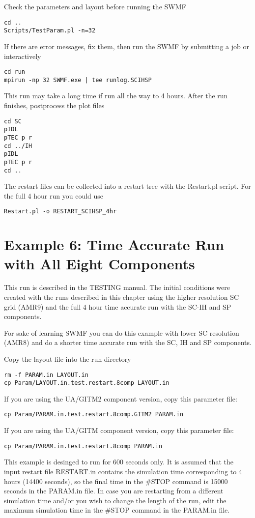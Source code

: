 Check the parameters and layout before running the SWMF
\begin{verbatim}
cd ..
Scripts/TestParam.pl -n=32
\end{verbatim}
If there are error messages, fix them, then run the SWMF by submitting a job
or interactively
\begin{verbatim}
cd run
mpirun -np 32 SWMF.exe | tee runlog.SCIHSP
\end{verbatim}
This run may take a long time if run all the way to 4 hours.
After the run finishes, postprocess the plot files
\begin{verbatim}
cd SC
pIDL
pTEC p r
cd ../IH
pIDL
pTEC p r
cd ..
\end{verbatim}
The restart files can be collected into a restart tree 
with the Restart.pl script. For the full 4 hour run you could use
\begin{verbatim}
Restart.pl -o RESTART_SCIHSP_4hr
\end{verbatim}

\section{Example 6: Time Accurate Run with All Eight Components}

This run is described in the TESTING manual. 
The initial conditions were created with the runs described in
this chapter using the higher resolution SC grid (AMR9) and the full 4 hour
time accurate run with the SC-IH and SP components.

For sake of learning SWMF you can do this example with lower SC resolution
(AMR8) and do a shorter time accurate run with the SC, IH and SP components.

Copy the layout file into the run directory
\begin{verbatim}
rm -f PARAM.in LAYOUT.in
cp Param/LAYOUT.in.test.restart.8comp LAYOUT.in
\end{verbatim}
If you are using the UA/GITM2 component version, copy this parameter file:
\begin{verbatim}
cp Param/PARAM.in.test.restart.8comp.GITM2 PARAM.in
\end{verbatim}
If you are using the UA/GITM component version, copy this parameter file:
\begin{verbatim}
cp Param/PARAM.in.test.restart.8comp PARAM.in
\end{verbatim}
This example is desinged to run for 600 seconds only.
It is assumed that the input restart file RESTART.in contains
the simulation time corresponding to 4 hours (14400 seconds),
so the final time in the \#STOP command is 15000 seconds
in the PARAM.in file.
In case you are restarting from a different simulation time and/or
you wish to change the length of the run, edit the maximum
simulation time in the \#STOP command in the PARAM.in file.

